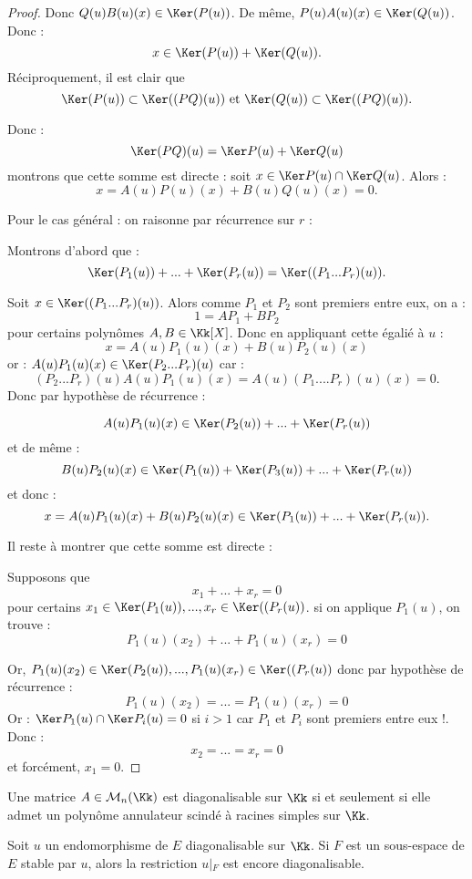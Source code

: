 \documentclass[class=report,crop=false]{standalone}
\newcommand{\Res}[1]{{\left | {}_{#1} \right.}}
\begin{document}
\begin{proof}
 Donc $Q(u)B(u)(x) \in \Ker (P(u))$. De même, $P(u)A(u)(x) \in \Ker (Q(u))$. Donc :
\[x \in \Ker (P(u))  + \Ker (Q(u)) .\]
Réciproquement, il est clair que \[\Ker (P(u)) \subset \Ker ((PQ)(u)) \text{ et } \Ker (Q(u)) \subset \Ker ((PQ)(u)) .\]

 Donc :
\[\Ker(PQ)(u) = \Ker P(u) + \Ker Q(u)\]
montrons que cette somme est directe :
soit $x\in \Ker P(u) \cap \Ker Q(u)$. Alors :
\[x = A(u)P(u)(x) + B(u)Q(u)(x) = 0 .\]

Pour le cas général : on raisonne par récurrence sur $r$ :

Montrons d'abord que :
\[\Ker (P_1(u)) + ... + \Ker (P_r(u)) =\Ker ((P_1...P_r)(u)) .\]

Soit $x \in \Ker((P_1...P_r)(u))$. Alors comme $P_1$ et $P_2$ sont premiers entre eux, on a :
\[1 = AP_1 + BP_2\] pour certains polynômes $A,B \in \Kk[X]$. Donc en appliquant cette égalié à $u$ :
\[x = A(u)P_1(u)(x) + B(u)P_2(u)(x)\] 
or : $A(u)P_1(u)(x) \in \Ker (P_2...P_r)(u)$ car :
\[(P_2...P_r)(u)A(u)P_1(u)(x) = A(u)(P_1....P_r)(u)(x) =0 .\]
Donc par hypothèse de récurrence :

\[A(u)P_1(u)(x) \in \Ker (P_2(u)) + ... + \Ker (P_r(u))\]
et de même :
\[B(u)P_2(u)(x) \in \Ker (P_1(u)) + \Ker (P_3(u)) +... + \Ker (P_r(u))\]
et donc :
\[x = A(u)P_1(u)(x) + B(u)P_2(u)(x) \in \Ker (P_1(u))  +... + \Ker (P_r(u)) .\]

Il reste à montrer que cette somme est directe :

Supposons que \[x_1 +...+x_r =0\]
pour certains $x_1 \in \Ker (P_1(u)), ... ,x_r \in \Ker((P_r(u))$. si on applique $P_1(u)$, on trouve :
\[P_1(u)(x_2) +... + P_1(u)(x_r) = 0\]

Or, $P_1(u)(x_2) \in \Ker (P_2(u)), ... ,P_1(u)(x_r) \in \Ker((P_r(u))$ donc par hypothèse de récurrence :
\[P_1(u)(x_2) = ... = P_1(u)(x_r)=0\]
Or : $\Ker P_1(u) \cap \Ker P_i(u) =0$ si $i >1$ car $P_1$ et $P_i$ sont premiers entre eux !. Donc :
\[x_2 = ... = x_r =0 \]
et forcément, $x_1=0$.
\end{proof}

\begin{corollaire}
Une matrice $A \in \mathcal{M}_n(\Kk)$ est diagonalisable sur $\Kk$ si et seulement si elle admet un polynôme annulateur scindé à racines simples sur $\Kk$.
\end{corollaire}

\begin{corollaire}
Soit $u$ un endomorphisme de $E$ diagonalisable sur $\Kk$. Si $F$ est un sous-espace de $E$ stable par $u$, alors la restriction $u\Res{F}$ est encore diagonalisable.
\end{corollaire}
\end{document}
